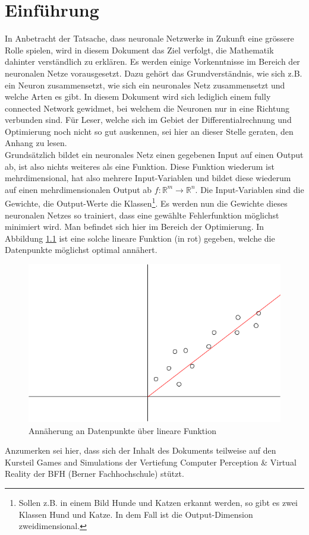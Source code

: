 \chapter{Einführung}
In Anbetracht der Tatsache, dass neuronale Netzwerke in Zukunft eine grössere Rolle spielen, wird in diesem Dokument
das Ziel verfolgt, die Mathematik dahinter verständlich zu erklären. Es werden einige Vorkenntnisse im Bereich der neuronalen Netze
vorausgesetzt. Dazu gehört das Grundverständnis, wie sich z.B. ein Neuron zusammensetzt, wie sich ein neuronales Netz
zusammensetzt und welche Arten es gibt. In diesem Dokument wird sich lediglich einem \glqq fully connected Network\grqq{} gewidmet,
bei welchem die Neuronen nur in eine Richtung verbunden sind. Für Leser, welche sich im Gebiet der
Differentialrechnung und Optimierung noch nicht so gut auskennen, sei hier an dieser Stelle geraten, den Anhang zu lesen.
\\

Grundsätzlich bildet ein neuronales Netz einen gegebenen Input auf einen Output ab, ist also nichts weiteres als
eine Funktion. Diese Funktion wiederum ist mehrdimensional, hat also mehrere Input-Variablen und bildet diese wiederum
auf einen mehrdimensionalen Output ab $f: \mathbb{R}^m \rightarrow \mathbb{R}^n$. Die Input-Variablen sind die Gewichte, die Output-Werte
die Klassen\footnote{Sollen z.B. in einem Bild Hunde und Katzen erkannt werden, so gibt es zwei Klassen \glqq Hund\grqq{} und \glqq Katze\grqq.
In dem Fall ist die Output-Dimension zweidimensional.}. Es werden nun die Gewichte dieses neuronalen Netzes so trainiert, dass eine gewählte Fehlerfunktion
möglichst minimiert wird. Man befindet sich hier im Bereich der Optimierung. In Abbildung \ref{fig:05_approximation}
ist eine solche lineare Funktion (in rot) gegeben, welche die Datenpunkte möglichst optimal annähert.
\begin{figure}[h!]
    \begin{center}
        \includegraphics[width=0.3\linewidth]{../common/00_introduction/00_resources/00_approximation.png}
    \end{center}
    \caption{Annäherung an Datenpunkte über lineare Funktion}
    \label{fig:05_approximation}
\end{figure}

Anzumerken sei hier, dass sich der Inhalt des Dokuments teilweise auf den Kursteil \glqq Games and Simulations\grqq{} der Vertiefung
\glqq Computer Perception \& Virtual Reality\grqq{} der BFH (Berner Fachhochschule) stützt.